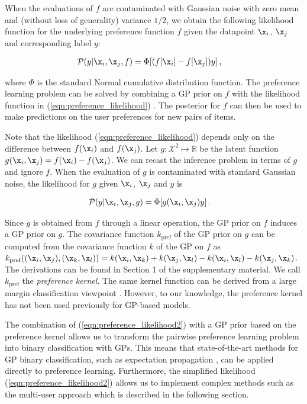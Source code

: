 When the evaluations of $f$ are contaminated with Gaussian noise with zero mean and (without loss of generality) variance $1/2$, we obtain the following likelihood function for the underlying preference function $f$ given the datapoint $\x_i$, $\x_j$ and corresponding label $y$:

\begin{align}
\mathcal{P}(y|\x_i,\x_j,f) &= \Phi[(f[\x_i] - f[\x_j])y]\,,\label{eqn:preference_likelihood}
\end{align}

where $\Phi$ is the standard Normal cumulative distribution function. The preference learning problem can be solved by combining a GP prior on $f$ with the likelihood function in (\ref{eqn:preference_likelihood}) \cite{chu2005}. The posterior for $f$ can
then be used to make predictions on the user preferences for new pairs of items.

Note that the likelihood (\ref{eqn:preference_likelihood}) depends only on the difference between $f(\x_i)$ and $f(\x_j)$.
Let $g:\mathcal{X}^2\mapsto\mathbb{R}$ be the latent function $g(\x_i,\x_j) = f(\x_i) - f(\x_j)$.
We can recast the inference problem in terms of $g$ and ignore $f$. When the evaluation of $g$ is contaminated with standard Gaussian noise, the likelihood for $g$ given $\x_i$, $\x_j$ and $y$ is

\begin{align}
\mathcal{P}(y|\x_i,\x_j,g) &= \Phi[g(\x_i, \x_j)y]\,.\label{eqn:preference_likelihood2}
\end{align}

Since $g$ is obtained from $f$ through a linear operation, the GP prior on $f$ induces a GP prior on $g$.
The covariance function $k_\text{pref}$ of the GP prior on $g$ can be computed from the covariance function $k$ of the GP on $f$ as $k_\text{pref}((\x_i,\x_j),(\x_k,\x_l)) = k(\x_i,\x_k) + k(\x_j,\x_l) - k(\x_i,\x_l) - k(\x_j,\x_k)$. The derivations can be found in Section 1 of the supplementary material. We call $k_\text{pref}$ the \emph{preference kernel}. The same kernel function can be derived from a large margin classification viewpoint \cite{furnkranz2010}. However, to our knowledge, the preference kernel has not been used previously for GP-based models.	

The combination of (\ref{eqn:preference_likelihood2}) with a GP prior based on the preference kernel allows us to transform the pairwise preference learning problem into  binary classification with GPs. This means that state-of-the-art methods for GP binary classification, such as expectation propagation \cite{Minka2001}, can be applied directly to preference learning. Furthermore, the simplified likelihood (\ref{eqn:preference_likelihood2}) allows us to implement complex methods such as the multi-user approach which is described in the following section.

